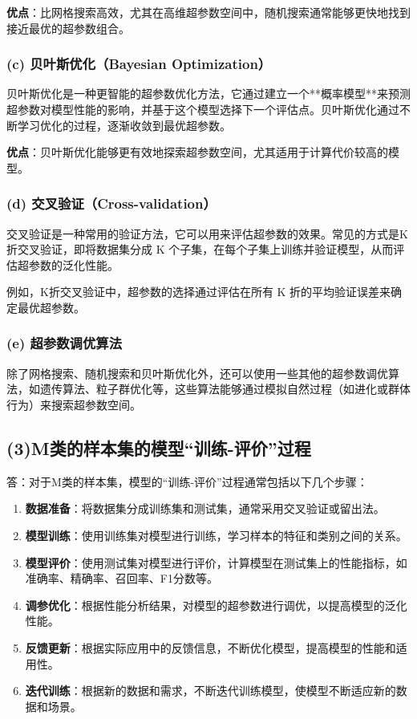 \documentclass{article}
\begin{document}
\textbf{优点}：比网格搜索高效，尤其在高维超参数空间中，随机搜索通常能够更快地找到接近最优的超参数组合。

\subsubsection*{(c) 贝叶斯优化（Bayesian Optimization）}
贝叶斯优化是一种更智能的超参数优化方法，它通过建立一个**概率模型**来预测超参数对模型性能的影响，并基于这个模型选择下一个评估点。贝叶斯优化通过不断学习优化的过程，逐渐收敛到最优超参数。

\textbf{优点}：贝叶斯优化能够更有效地探索超参数空间，尤其适用于计算代价较高的模型。

\subsubsection*{(d) 交叉验证（Cross-validation）}
交叉验证是一种常用的验证方法，它可以用来评估超参数的效果。常见的方式是K折交叉验证，即将数据集分成 K 个子集，在每个子集上训练并验证模型，从而评估超参数的泛化性能。

例如，K折交叉验证中，超参数的选择通过评估在所有 K 折的平均验证误差来确定最优超参数。

\subsubsection*{(e) 超参数调优算法}
除了网格搜索、随机搜索和贝叶斯优化外，还可以使用一些其他的超参数调优算法，如遗传算法、粒子群优化等，这些算法能够通过模拟自然过程（如进化或群体行为）来搜索超参数空间。

\subsection{(3)M类的样本集的模型“训练-评价”过程}
答：对于M类的样本集，模型的“训练-评价”过程通常包括以下几个步骤：
\begin{enumerate}
    \item \textbf{数据准备}：将数据集分成训练集和测试集，通常采用交叉验证或留出法。
    \item \textbf{模型训练}：使用训练集对模型进行训练，学习样本的特征和类别之间的关系。
    \item \textbf{模型评价}：使用测试集对模型进行评价，计算模型在测试集上的性能指标，如准确率、精确率、召回率、F1分数等。
    \item \textbf{调参优化}：根据性能分析结果，对模型的超参数进行调优，以提高模型的泛化性能。    
    \item \textbf{反馈更新}：根据实际应用中的反馈信息，不断优化模型，提高模型的性能和适用性。
    \item \textbf{迭代训练}：根据新的数据和需求，不断迭代训练模型，使模型不断适应新的数据和场景。
\end{enumerate}
\end{document}

